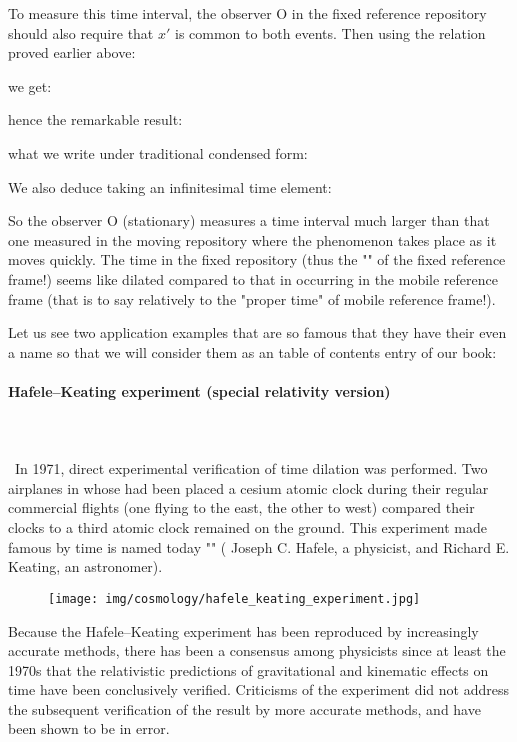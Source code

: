 	To measure this time interval, the observer O in the fixed reference repository should also require that $x'$ is common to both events. Then using the relation proved earlier above:
	
	we get:
	
	hence the remarkable result:
	
	what we write under traditional condensed form:
	
	We also deduce taking an infinitesimal time element:
	
	So the observer O (stationary) measures a time interval much larger than that one measured in the moving repository where the phenomenon takes place as it moves quickly. The time in the fixed repository (thus the "" of the fixed reference frame!) seems like dilated compared to that in occurring in the mobile reference frame (that is to say relatively to the "proper time" of mobile reference frame!).
	
	Let us see two application examples that are so famous that they have their even a name so that we will consider them as an table of contents entry of our book:
	
	\paragraph{Hafele–Keating experiment (special relativity version)}\label{hafele keating experiment special relativity}\mbox{}\\\\\
	In 1971, direct experimental verification of time dilation was performed. Two airplanes in whose had been placed a cesium atomic clock during their regular commercial flights (one flying to the east, the other to west) compared their clocks to a third  atomic clock remained on the ground. This experiment made famous by time is named today "" ( Joseph C. Hafele, a physicist, and Richard E. Keating, an astronomer).
	\begin{figure}[H]
		\begin{center}
		\texttt{[image: img/cosmology/hafele\_keating\_experiment.jpg]}
		\end{center}
	\end{figure}
	Because the Hafele–Keating experiment has been reproduced by increasingly accurate methods, there has been a consensus among physicists since at least the 1970s that the relativistic predictions of gravitational and kinematic effects on time have been conclusively verified. Criticisms of the experiment did not address the subsequent verification of the result by more accurate methods, and have been shown to be in error.

